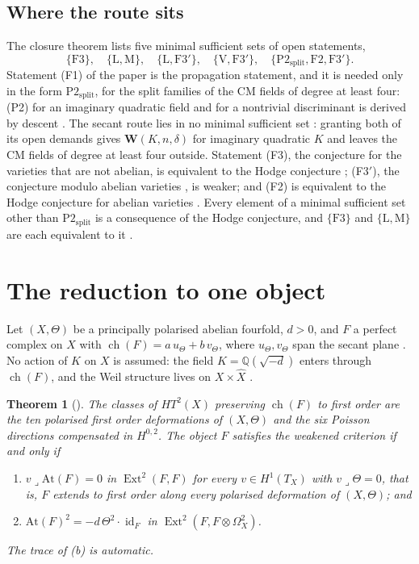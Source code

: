 \documentclass[11pt]{amsart}
\newtheorem{theorem}{Theorem}[section]
\theoremstyle{definition}
\theoremstyle{remark}
\newcommand{\QQ}{\mathbb{Q}}
\newcommand{\ch}{\operatorname{ch}}
\newcommand{\Ext}{\operatorname{Ext}}
\newcommand{\id}{\operatorname{id}}
\newcommand{\At}{\mathrm{At}}
\begin{document}
\subsection*{Where the route sits}
The closure theorem \cite[Theorem~20.58]{BMB} lists five minimal sufficient
sets of open statements,
\[
  \{\mathrm{F3}\},\quad\{\mathrm{L},\mathrm{M}\},\quad
  \{\mathrm{L},\mathrm{F3}'\},\quad\{\mathrm{V},\mathrm{F3}'\},\quad
  \{\mathrm{P2}_{\mathrm{split}},\mathrm{F2},\mathrm{F3}'\}.
\]
Statement (F1) of the paper is the propagation statement, and it is needed
only in the form $\mathrm{P2}_{\mathrm{split}}$, for the split families of
the CM fields of degree at least four: (P2) for an imaginary quadratic field
and for a nontrivial discriminant is derived by descent
\cite[Proposition~20.13]{BMB}. The secant
route lies in no minimal sufficient set \cite[Theorem~20.58(iv)]{BMB}:
granting both of its open demands gives $\mathbf{W}(K,n,\delta)$ for
imaginary quadratic $K$ and leaves the CM fields of degree at least four
outside. Statement (F3), the conjecture for the varieties that are not
abelian, is equivalent to the Hodge conjecture
\cite[Proposition~20.35]{BMB}; (F3$'$), the conjecture modulo abelian
varieties \cite[Definition~20.36]{BMB}, is weaker; and (F2) is equivalent to
the Hodge conjecture for abelian varieties \cite[Proposition~21.49]{BMB}.
Every element of a minimal sufficient set other than
$\mathrm{P2}_{\mathrm{split}}$ is a consequence of the Hodge conjecture, and
$\{\mathrm{F3}\}$ and $\{\mathrm{L},\mathrm{M}\}$ are each equivalent to it
\cite[Theorem~20.58(vi)]{BMB}.

\section{The reduction to one object}\label{sec:reduction}

Let $(X,\Theta)$ be a principally polarised abelian fourfold, $d>0$, and $F$
a perfect complex on $X$ with $\ch(F)=a\,u_{\Theta}+b\,v_{\Theta}$, where
$u_{\Theta},v_{\Theta}$ span the secant plane \cite[Section~18]{BMB}. No
action of $K$ on $X$ is assumed: the field $K=\QQ(\sqrt{-d})$ enters through
$\ch(F)$, and the Weil structure lives on $X\times\widehat X$
\cite[Proposition~18.25(v), Theorem~18.29(iv)]{BMB}.

\begin{theorem}[{\cite[Theorem~18.29(ii), (iii)]{BMB}}]\label{thm:factor}
The classes of $HT^{2}(X)$ preserving $\ch(F)$ to first order are the ten
polarised first order deformations of $(X,\Theta)$ and the six Poisson
directions compensated in $H^{0,2}$. The object $F$ satisfies the weakened
criterion if and only if
\begin{enumerate}[label=\textup{(\alph*)},nosep]
\item $v\lrcorner\At(F)=0$ in $\Ext^{2}(F,F)$ for every $v\in H^{1}(T_{X})$
  with $v\lrcorner\Theta=0$, that is, $F$ extends to first order along every
  polarised deformation of $(X,\Theta)$; and
\item $\At(F)^{2}=-d\,\Theta^{2}\cdot\id_{F}$ in
  $\Ext^{2}(F,F\otimes\Omega^{2}_{X})$.
\end{enumerate}
The trace of \textup{(b)} is automatic.
\end{theorem}
\end{document}
